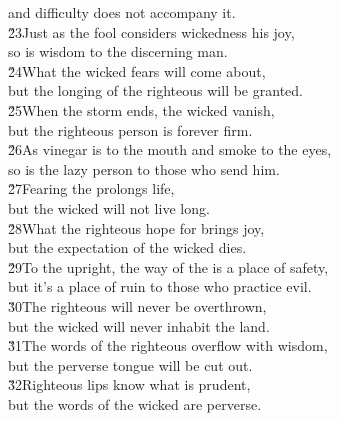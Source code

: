 \begin{poetry}
\poemll    and difficulty does not accompany it. \\
\poeml \v{23}Just as the fool considers wickedness his joy, \\
\poemll    so is wisdom to the discerning man. \\
\poeml \v{24}What the wicked fears will come about, \\
\poemll    but the longing of the righteous will be granted. \\
\poeml \v{25}When the storm ends, the wicked vanish, \\
\poemll    but the righteous person is forever firm. \\
\poeml \v{26}As vinegar is to the mouth and smoke to the eyes, \\
\poemll    so is the lazy person to those who send him. \\
\poeml \v{27}Fearing the  prolongs life, \\
\poemll    but the wicked will not live long. \\
\poeml \v{28}What the righteous hope for brings joy, \\
\poemll    but the expectation of the wicked dies. \\
\poeml \v{29}To the upright, the way of the  is a place of safety, \\
\poemll    but it's a place of ruin to those who practice evil. \\
\poeml \v{30}The righteous will never be overthrown, \\
\poemll    but the wicked will never inhabit the land. \\
\poeml \v{31}The words of the righteous overflow with wisdom, \\
\poemll    but the perverse tongue will be cut out. \\
\poeml \v{32}Righteous lips know what is prudent, \\
\poemll    but the words of the wicked are perverse.
\end{poetry}

